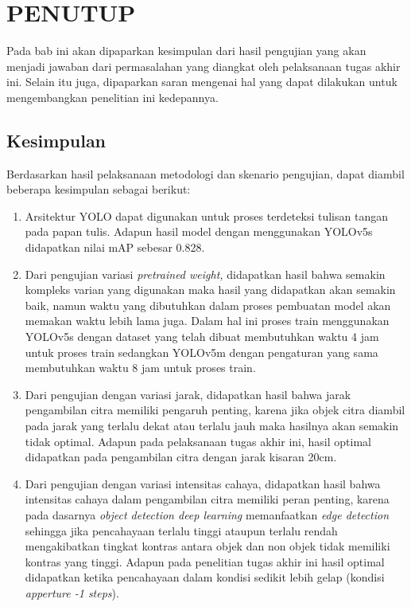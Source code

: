 \chapter{PENUTUP}
\label{chap:penutup}

Pada bab ini akan dipaparkan kesimpulan dari hasil pengujian yang akan menjadi jawaban dari permasalahan yang diangkat oleh pelaksanaan tugas akhir ini. Selain itu juga, dipaparkan saran mengenai hal yang dapat dilakukan untuk mengembangkan penelitian ini kedepannya.

\section{Kesimpulan}
\label{sec:kesimpulan}

Berdasarkan hasil pelaksanaan metodologi dan skenario pengujian, dapat diambil beberapa kesimpulan sebagai berikut:
\begin{enumerate}[nolistsep]
    \item Arsitektur YOLO dapat digunakan untuk proses terdeteksi tulisan tangan pada papan tulis. Adapun hasil model dengan menggunakan YOLOv5s didapatkan nilai mAP sebesar 0.828.
    \item Dari pengujian variasi \textit{pretrained weight,} didapatkan hasil bahwa semakin kompleks varian yang digunakan maka hasil yang didapatkan akan semakin baik, namun waktu yang dibutuhkan dalam proses pembuatan model akan memakan waktu lebih lama juga. Dalam hal ini proses train menggunakan YOLOv5s dengan dataset yang telah dibuat membutuhkan waktu 4 jam untuk proses train sedangkan YOLOv5m dengan pengaturan yang sama membutuhkan waktu 8 jam untuk proses train.
    \item Dari pengujian dengan variasi jarak, didapatkan hasil bahwa jarak pengambilan citra memiliki pengaruh penting, karena jika objek citra diambil pada jarak yang terlalu dekat atau terlalu jauh maka hasilnya akan semakin tidak optimal. Adapun pada pelaksanaan tugas akhir ini, hasil optimal didapatkan pada pengambilan citra dengan jarak kisaran 20cm.
    \item Dari pengujian dengan variasi intensitas cahaya, didapatkan hasil bahwa intensitas cahaya dalam pengambilan citra memiliki peran penting, karena pada dasarnya \textit{object detection deep learning} memanfaatkan \textit{edge detection} sehingga jika pencahayaan terlalu tinggi ataupun terlalu rendah mengakibatkan tingkat kontras antara objek dan non objek tidak memiliki kontras yang tinggi. Adapun pada penelitian tugas akhir ini hasil optimal didapatkan ketika pencahayaan dalam kondisi sedikit lebih gelap (kondisi \textit{apperture -1 steps}).
\end{enumerate}

